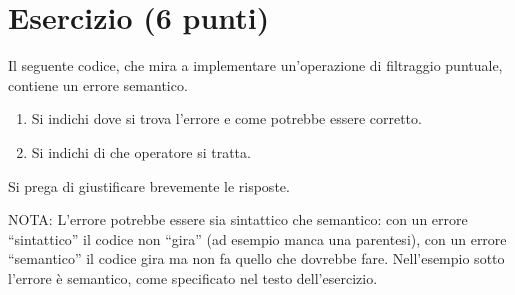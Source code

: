 \documentclass[a4paper]{article}
\newcommand{\dquotes}[1]{``#1''}
\begin{document}
	\section{Esercizio (6 punti)}
	
	Il seguente codice, che mira a implementare un'operazione di filtraggio puntuale, contiene un errore semantico.
	\begin{enumerate}
		\item Si indichi dove si trova l'errore e come potrebbe essere corretto.
		\item Si indichi di che operatore si tratta.
	\end{enumerate}
	Si prega di giustificare brevemente le risposte.\newline
	
	\noindent
	NOTA: L'errore potrebbe essere sia sintattico che semantico: con un errore \dquotes{sintattico} il codice non \dquotes{gira} (ad esempio manca una parentesi), con un errore \dquotes{semantico} il codice gira ma non fa quello che dovrebbe fare. Nell'esempio sotto l'errore è semantico, come specificato nel testo dell'esercizio.
	
	
\end{document}
